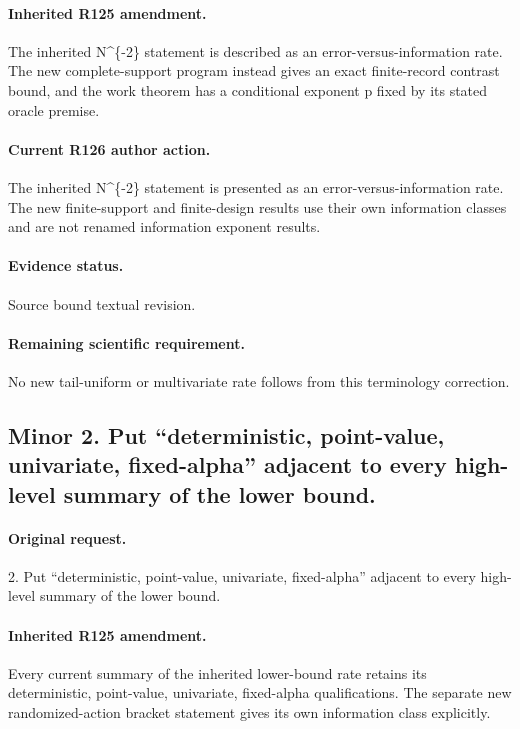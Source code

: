 \paragraph{Inherited R125 amendment.} The inherited N\textasciicircum{}\{-2\} statement is described as an error-versus-information rate. The new complete-support program instead gives an exact finite-record contrast bound, and the work theorem has a conditional exponent p fixed by its stated oracle premise.

\paragraph{Current R126 author action.} The inherited N\textasciicircum{}\{-2\} statement is presented as an error-versus-information rate. The new finite-support and finite-design results use their own information classes and are not renamed information exponent results.

\paragraph{Evidence status.} Source bound textual revision.


\paragraph{Remaining scientific requirement.} No new tail-uniform or multivariate rate follows from this terminology correction.

\subsection*{Minor 2. Put “deterministic, point-value, univariate, fixed-alpha” adjacent to every high-level summary of the lower bound.}
\paragraph{Original request.} 2. Put “deterministic, point-value, univariate, fixed-alpha” adjacent to every high-level summary of the lower bound.

\paragraph{Inherited R125 amendment.} Every current summary of the inherited lower-bound rate retains its deterministic, point-value, univariate, fixed-alpha qualifications. The separate new randomized-action bracket statement gives its own information class explicitly.

